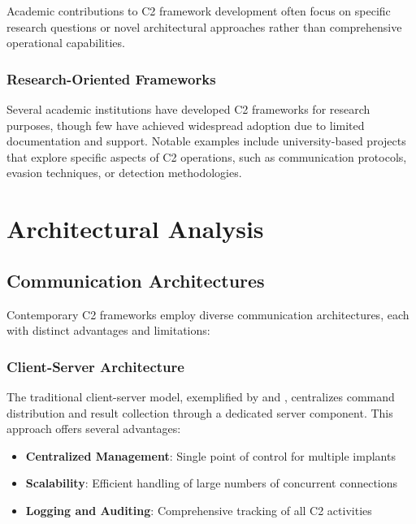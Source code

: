 Academic contributions to C2 framework development often focus on specific research questions or novel architectural approaches rather than comprehensive operational capabilities.

\subsubsection{Research-Oriented Frameworks}

Several academic institutions have developed C2 frameworks for research purposes, though few have achieved widespread adoption due to limited documentation and support. Notable examples include university-based projects that explore specific aspects of C2 operations, such as communication protocols, evasion techniques, or detection methodologies.

\section{Architectural Analysis}
\label{sec:architectural_analysis}

\subsection{Communication Architectures}
\label{subsec:communication_architectures}

Contemporary C2 frameworks employ diverse communication architectures, each with distinct advantages and limitations:

\subsubsection{Client-Server Architecture}

The traditional client-server model, exemplified by  and , centralizes command distribution and result collection through a dedicated server component. This approach offers several advantages:

\begin{itemize}
\item \textbf{Centralized Management}: Single point of control for multiple implants
\item \textbf{Scalability}: Efficient handling of large numbers of concurrent connections
\item \textbf{Logging and Auditing}: Comprehensive tracking of all C2 activities
\end{itemize}

